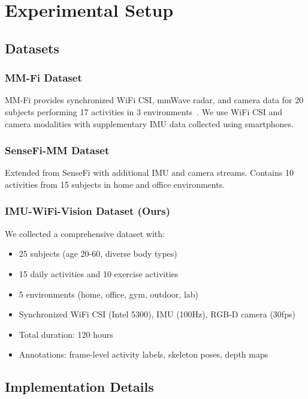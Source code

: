 \documentclass[journal]{IEEEtran}
\begin{document}
\section{Experimental Setup}

\subsection{Datasets}

\subsubsection{MM-Fi Dataset}

MM-Fi provides synchronized WiFi CSI, mmWave radar, and camera data for 20 subjects performing 17 activities in 3 environments~\cite{mmfi2023}. We use WiFi CSI and camera modalities with supplementary IMU data collected using smartphones.

\subsubsection{SenseFi-MM Dataset}

Extended from SenseFi with additional IMU and camera streams. Contains 10 activities from 15 subjects in home and office environments.

\subsubsection{IMU-WiFi-Vision Dataset (Ours)}

We collected a comprehensive dataset with:
\begin{itemize}
\item 25 subjects (age 20-60, diverse body types)
\item 15 daily activities and 10 exercise activities
\item 5 environments (home, office, gym, outdoor, lab)
\item Synchronized WiFi CSI (Intel 5300), IMU (100Hz), RGB-D camera (30fps)
\item Total duration: 120 hours
\item Annotations: frame-level activity labels, skeleton poses, depth maps
\end{itemize}

\subsection{Implementation Details}
\end{document}
